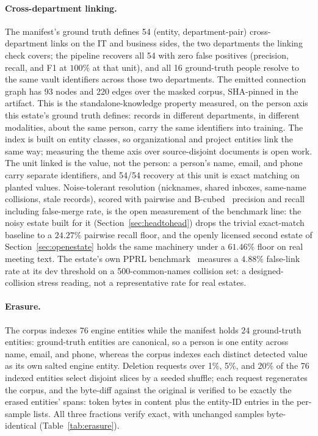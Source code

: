 \documentclass{article}
\begin{document}
\paragraph{Cross-department linking.}
The manifest's ground truth defines 54 (entity, department-pair) cross-department links on the IT and business sides, the two departments the linking check covers; the pipeline recovers all 54 with zero false positives (precision, recall, and F1 at $100\%$ at that unit), and all 16 ground-truth people resolve to the same vault identifiers across those two departments. The emitted connection graph has 93 nodes and 220 edges over the masked corpus, SHA-pinned in the artifact. This is the standalone-knowledge property measured, on the person axis this estate's ground truth defines: records in different departments, in different modalities, about the same person, carry the same identifiers into training. The index is built on entity classes, so organizational and project entities link the same way; measuring the theme axis over source-disjoint documents is open work. The unit linked is the value, not the person: a person's name, email, and phone carry separate identifiers, and 54/54 recovery at this unit is exact matching on planted values. Noise-tolerant resolution (nicknames, shared inboxes, same-name collisions, stale records), scored with pairwise and B-cubed~\cite{bagga1998bcubed} precision and recall including false-merge rate, is the open measurement of the benchmark line: the noisy estate built for it (Section~\ref{sec:headtohead}) drops the trivial exact-match baseline to a $24.27\%$ pairwise recall floor, and the openly licensed second estate of Section~\ref{sec:openestate} holds the same machinery under a $61.46\%$ floor on real meeting text. The estate's own PPRL benchmark~\cite{christen2012datamatching} measures a $4.88\%$ false-link rate at its dev threshold on a 500-common-names collision set: a designed-collision stress reading, not a representative rate for real estates.

\paragraph{Erasure.}
The corpus indexes $76$ engine entities while the manifest holds $24$ ground-truth entities: ground-truth entities are canonical, so a person is one entity across name, email, and phone, whereas the corpus indexes each distinct detected value as its own salted engine entity. Deletion requests over 1\%, 5\%, and 20\% of the 76 indexed entities select disjoint slices by a seeded shuffle; each request regenerates the corpus, and the byte-diff against the original is verified to be exactly the erased entities' spans: token bytes in content plus the entity-ID entries in the per-sample lists. All three fractions verify exact, with unchanged samples byte-identical (Table~\ref{tab:erasure}).
\end{document}
